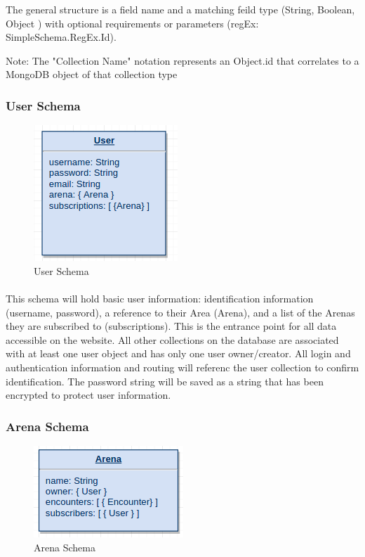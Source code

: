 \documentclass[12pt,a4paper]{report}
\begin{document}
		The general structure is a field name and a matching feild type (String, Boolean, Object ) with optional requirements or parameters (regEx: SimpleSchema.RegEx.Id).
		
		Note: The { "Collection Name" } notation represents an Object.id that correlates to a MongoDB object of that collection type
		\subsubsection{User Schema}
			\begin{figure}[h]
				\centering
				\includegraphics[scale=.75]{schema-user}
				\caption{User Schema}
				\label{fig: User Schema }
			\end{figure}
			
		\paragraph{}This schema will hold basic user information: identification information (username, password), a reference to their Area (Arena), and a list of the Arenas they are subscribed to (subscriptions). This is the entrance point for all data accessible on the website. All other collections on the database are associated with at least one user object and has only one user owner/creator. All login and authentication information and routing will referenc the user collection to confirm identification. The password string will be saved as a string that has been encrypted to protect user information.
		\subsubsection{Arena Schema}
		
			\begin{figure}[h]
				\centering
				\includegraphics[scale=.75]{schema-arena}
				\caption{Arena Schema}
				\label{fig: Arena Schema }
			\end{figure}
		
\end{document}
